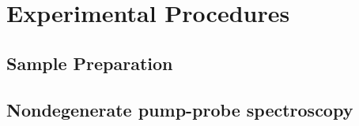 \chapter{Experimental Procedures}
\label{ch:Sample_Methods}

\section{Sample Preparation}

\section{Nondegenerate pump-probe spectroscopy }

